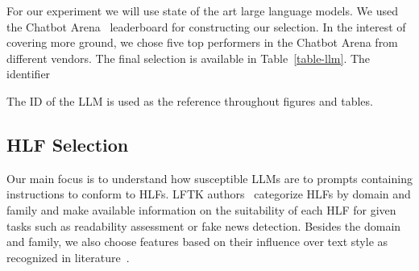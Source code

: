 \documentclass[11pt]{article}
\begin{document}
For our experiment we will use state of the art large language models.
We used the Chatbot Arena~\cite{chiang2024chatbot} leaderboard for constructing
our selection.
In the interest of covering more ground, we chose five top performers in the
Chatbot Arena from different vendors.
The final selection is available in Table~\ref{table-llm}. The identifier

\begin{table}[ht]
    \setlength\tabcolsep{6pt}
    \centering
    \caption{Large Language Model Selection}\label{table-llm}
\end{table}

The ID of the LLM is used as the reference throughout figures and tables.

\subsection{HLF Selection}\label{hlf-selection}

Our main focus is to understand how susceptible LLMs are to prompts containing
instructions to conform to HLFs.
LFTK authors~\cite{lftk-2023} categorize HLFs by domain and family and make
available information on the suitability of each HLF for given tasks such as
readability assessment or fake news detection.
Besides the domain and family, we also choose features based on their influence
over text style as recognized in literature~\cite{verma2019lexical,lugea2023stylistics}.
\end{document}
